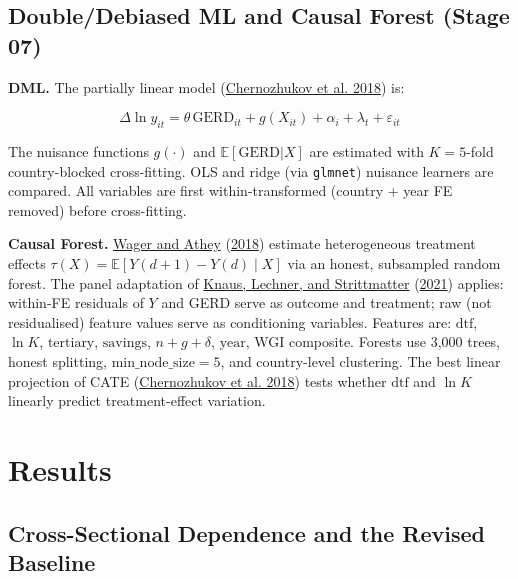 \documentclass[
  11pt,
]{article}
\begin{document}
\hypertarget{doubledebiased-ml-and-causal-forest-stage-07}{%
\subsection{Double/Debiased ML and Causal Forest (Stage 07)}\label{doubledebiased-ml-and-causal-forest-stage-07}}

\textbf{DML.} The partially linear model (\protect\hyperlink{ref-chernozhukov2018}{Chernozhukov et al. 2018}) is:

\[\Delta\ln y_{it} = \theta\,\text{GERD}_{it} + g(X_{it}) + \alpha_i + \lambda_t + \varepsilon_{it}\]

The nuisance functions \(g(\cdot)\) and \(\mathbb{E}[\text{GERD}|X]\) are estimated with \(K = 5\)-fold country-blocked cross-fitting. OLS and ridge (via \texttt{glmnet}) nuisance learners are compared. All variables are first within-transformed (country \(+\) year FE removed) before cross-fitting.

\textbf{Causal Forest.} \protect\hyperlink{ref-wagerathey2018}{Wager and Athey} (\protect\hyperlink{ref-wagerathey2018}{2018}) estimate heterogeneous treatment effects \(\tau(X) = \mathbb{E}[Y(d+1) - Y(d) \mid X]\) via an honest, subsampled random forest. The panel adaptation of \protect\hyperlink{ref-knaus2021}{Knaus, Lechner, and Strittmatter} (\protect\hyperlink{ref-knaus2021}{2021}) applies: within-FE residuals of \(Y\) and GERD serve as outcome and treatment; raw (not residualised) feature values serve as conditioning variables. Features are: \(\text{dtf}\), \(\ln K\), \(\text{tertiary}\), \(\text{savings}\), \(n+g+\delta\), \(\text{year}\), WGI composite. Forests use 3,000 trees, honest splitting, \(\text{min\_node\_size} = 5\), and country-level clustering. The best linear projection of CATE (\protect\hyperlink{ref-chernozhukov2018}{Chernozhukov et al. 2018}) tests whether \(\text{dtf}\) and \(\ln K\) linearly predict treatment-effect variation.

\hypertarget{sec:results}{%
\section{Results}\label{sec:results}}

\hypertarget{cross-sectional-dependence-and-the-revised-baseline}{%
\subsection{Cross-Sectional Dependence and the Revised Baseline}\label{cross-sectional-dependence-and-the-revised-baseline}}
\end{document}
